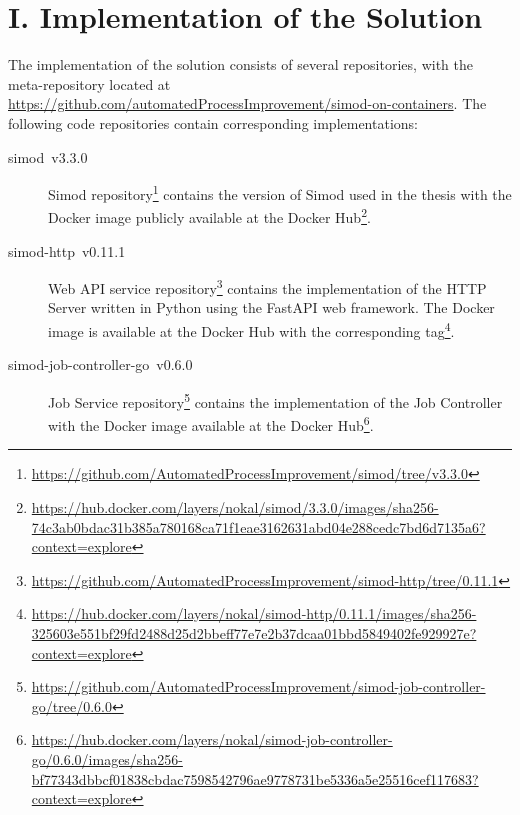 \documentclass[12pt]{article}
\begin{document}
\section*{I. Implementation of the Solution} \label{ch:appendix_implementation}

The implementation of the solution consists of several repositories, with the meta-repository located at \href{https://github.com/automatedProcessImprovement/simod-on-containers}{https://github.com/automatedProcessImprovement/simod-on-containers}. The following code repositories contain corresponding implementations:

\begin{description}
    \item[simod~v3.3.0] Simod repository\footnote{\href{https://github.com/AutomatedProcessImprovement/simod/tree/v3.3.0}{https://github.com/AutomatedProcessImprovement/simod/tree/v3.3.0}} contains the version of Simod used in the thesis with the Docker image publicly available at the Docker Hub\footnote{\href{https://hub.docker.com/layers/nokal/simod/3.3.0/images/sha256-74c3ab0bdac31b385a780168ca71f1eae3162631abd04e288cedc7bd6d7135a6?context=explore}{https://hub.docker.com/layers/nokal/simod/3.3.0/images/sha256-74c3ab0bdac31b385a780168ca71f1eae3162631abd04e288cedc7bd6d7135a6?context=explore}}.
    
    \item[simod-http~v0.11.1] Web API service repository\footnote{\href{https://github.com/AutomatedProcessImprovement/simod-http/tree/0.11.1}{https://github.com/AutomatedProcessImprovement/simod-http/tree/0.11.1}} contains the implementation of the HTTP Server written in Python using the FastAPI web framework. The Docker image is available at the Docker Hub with the corresponding tag\footnote{\href{https://hub.docker.com/layers/nokal/simod-http/0.11.1/images/sha256-325603e551bf29fd2488d25d2bbeff77e7e2b37dcaa01bbd5849402fe929927e?context=explore}{https://hub.docker.com/layers/nokal/simod-http/0.11.1/images/sha256-325603e551bf29fd2488d25d2bbeff77e7e2b37dcaa01bbd5849402fe929927e?context=explore}}.
    
    \item[simod-job-controller-go~v0.6.0] Job Service repository\footnote{\href{https://github.com/AutomatedProcessImprovement/simod-job-controller-go/tree/0.6.0}{https://github.com/AutomatedProcessImprovement/simod-job-controller-go/tree/0.6.0}} contains the implementation of the Job Controller with the Docker image available at the Docker Hub\footnote{\href{https://hub.docker.com/layers/nokal/simod-job-controller-go/0.6.0/images/sha256-bf77343dbbcf01838cbdac7598542796ae9778731be5336a5e25516cef117683?context=explore}{https://hub.docker.com/layers/nokal/simod-job-controller-go/0.6.0/images/sha256-bf77343dbbcf01838cbdac7598542796ae9778731be5336a5e25516cef117683?context=explore}}.
    

\end{description}
\end{document}
